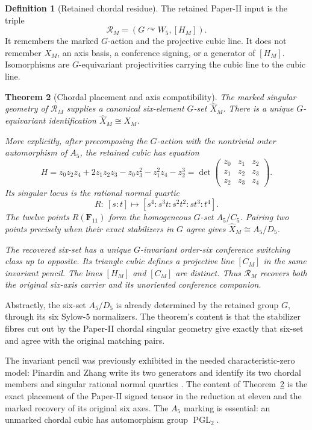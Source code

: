 \documentclass[11pt]{article}
\newtheorem{theorem}{Theorem}[section]
\theoremstyle{definition}
\newtheorem{definition}[theorem]{Definition}
\theoremstyle{remark}
\newcommand{\F}{\mathbf F}
\newcommand{\PGL}{\operatorname{PGL}}
\begin{document}
\begin{definition}[Retained chordal residue]
\label{def:retained-chordal-residue}
The retained Paper-II input is the triple
\[
 \mathcal R_M=(G\curvearrowright W_5,[H_M]).
\]
It remembers the marked \(G\)-action and the projective cubic line.  It does
not remember \(X_M\), an axis basis, a conference signing, or a generator of
\([H_M]\).  Isomorphisms are \(G\)-equivariant projectivities carrying the
cubic line to the cubic line.
\end{definition}

\begin{theorem}[Chordal placement and axis compatibility]
\label{thm:chordal-axis-reconstruction}
The marked singular geometry of \(\mathcal R_M\) supplies a canonical
six-element \(G\)-set \(\widehat X_M\).  There is a unique
\(G\)-equivariant identification \(\widehat X_M\cong X_M\).

More explicitly, after precomposing the \(G\)-action with the nontrivial
outer automorphism of \(A_5\), the retained cubic has equation
\[
 H=z_0z_2z_4+2z_1z_2z_3-z_0z_3^2-z_1^2z_4-z_2^3
   =\det\!\begin{pmatrix}
       z_0&z_1&z_2\\ z_1&z_2&z_3\\ z_2&z_3&z_4
     \end{pmatrix}.
\]
Its singular locus is the rational normal quartic
\[
 R:\ [s:t]\longmapsto[s^4:s^3t:s^2t^2:st^3:t^4].
\]
The twelve points \(R(\F_{11})\) form the homogeneous \(G\)-set
\(A_5/C_5\).  Pairing two points precisely when their exact stabilizers in
\(G\) agree gives \(\widehat X_M\cong A_5/D_5\).

The recovered six-set has a unique \(G\)-invariant order-six conference
switching class up to opposite.  Its triangle cubic defines a projective line
\([C_M]\) in the same invariant pencil.  The lines \([H_M]\) and \([C_M]\)
are distinct.  Thus \(\mathcal R_M\) recovers both the original six-axis
carrier and its unoriented conference companion.
\end{theorem}

Abstractly, the six-set \(A_5/D_5\) is already determined by the retained
group \(G\), through its six Sylow-\(5\) normalizers.  The theorem's content is
that the stabilizer fibres cut out by the Paper-II chordal singular geometry
give exactly that six-set and agree with the original matching pairs.

The invariant pencil was previously exhibited in the needed
characteristic-zero model: Pinardin and Zhang write its two generators and identify its two
chordal members and singular rational normal quartics
\cite[\S6.2, equations~(6.3)--(6.5)]{PinardinZhang2025}.  The content of
Theorem~\ref{thm:chordal-axis-reconstruction} is the exact placement of the
Paper-II signed tensor in the reduction at eleven and the marked recovery of
its original six axes.  The \(A_5\) marking is essential: an unmarked chordal
cubic has automorphism group \(\PGL_2\)\cite[\S5]{CheltsovEtAl2025Chordal}.
\end{document}
